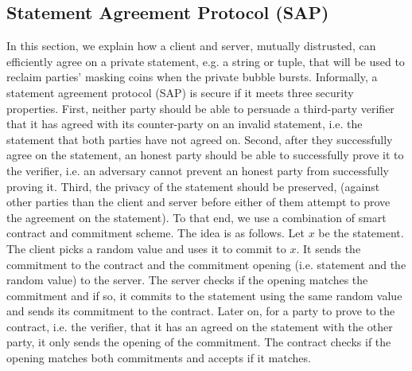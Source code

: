 
\subsection{Statement Agreement Protocol (SAP)}\label{SAP}



In this section, we explain how a client and server, mutually distrusted, can efficiently agree on a private statement, e.g.  a string or tuple, that will be used to reclaim parties' masking coins when the private bubble bursts. Informally, a statement agreement protocol (SAP) is secure if it meets three security properties. First, neither party should be able to persuade  a third-party  verifier that it has agreed with its counter-party on an invalid statement, i.e. the statement that both parties have not agreed on. Second, after they successfully agree on the statement,  an honest party should be able to successfully prove it to the verifier, i.e. an adversary cannot prevent an honest party from successfully proving it. Third, the privacy of the statement should be preserved, (against other parties than the client and server before either of them attempt to prove the agreement on the statement). To that end, we use a combination of smart contract and commitment scheme. The idea is as follows. Let $x$ be the statement. The client picks a random value and uses it to commit to $x$. It sends the commitment to the contract and the commitment opening (i.e. statement and the random value) to the server. The server checks if the opening matches the commitment and if so, it commits to the statement using the same random value and sends its commitment to the contract. Later on, for a party to prove to the contract, i.e. the verifier, that it has an agreed on the statement with the other party, it only sends the opening of the commitment.  The contract checks if the opening matches both commitments and accepts if it matches. 


